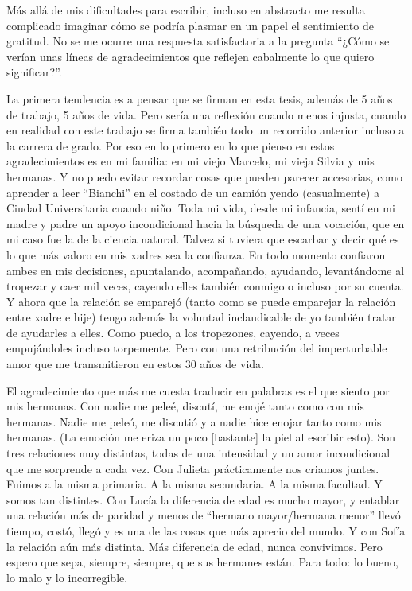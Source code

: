 Más allá de mis dificultades para escribir, incluso en abstracto me resulta complicado imaginar cómo se podría plasmar en un papel el sentimiento de gratitud.
No se me ocurre una respuesta satisfactoria a la pregunta ``¿Cómo se verían unas líneas de agradecimientos que reflejen cabalmente lo que quiero significar?''.

La primera tendencia es a pensar que se firman en esta tesis, además de 5 años de trabajo, 5 años de vida.
Pero sería una reflexión cuando menos injusta, cuando en realidad con este trabajo se firma también todo un recorrido anterior incluso a la carrera de grado.
Por eso en lo primero en lo que pienso en estos agradecimientos es en mi familia: en mi viejo Marcelo, mi vieja Silvia y mis hermanas.
Y no puedo evitar recordar cosas que pueden parecer accesorias, como aprender a leer ``Bianchi'' en el costado de un camión yendo (casualmente) a Ciudad Universitaria cuando niño.
Toda mi vida, desde mi infancia, sentí en mi madre y padre un apoyo incondicional hacia la búsqueda de una vocación, que en mi caso fue la de la ciencia natural.
Talvez si tuviera que escarbar y decir qué es lo que más valoro en mis xadres sea la confianza.
En todo momento confiaron ambes en mis decisiones, apuntalando, acompañando, ayudando, levantándome al tropezar y caer mil veces, cayendo elles también conmigo o incluso por su cuenta.
Y ahora que la relación se emparejó (tanto como se puede emparejar la relación entre xadre e hije) tengo además la voluntad inclaudicable de yo también tratar de ayudarles a elles.
Como puedo, a los tropezones, cayendo, a veces empujándoles incluso torpemente.
Pero con una retribución del imperturbable amor que me transmitieron en estos 30 años de vida.

El agradecimiento que más me cuesta traducir en palabras es el que siento por mis hermanas.
Con nadie me peleé, discutí, me enojé tanto como con mis hermanas.
Nadie me peleó, me discutió y a nadie hice enojar tanto como mis hermanas.
(La emoción me eriza un poco [bastante] la piel al escribir esto).
Son tres relaciones muy distintas, todas de una intensidad y un amor incondicional que me sorprende a cada vez.
Con Julieta prácticamente nos criamos juntes.
Fuimos a la misma primaria.
A la misma secundaria.
A la misma facultad.
Y somos tan distintes.
Con Lucía la diferencia de edad es mucho mayor, y entablar una relación más de paridad y menos de ``hermano mayor/hermana menor'' llevó tiempo, costó, llegó y es una de las cosas que más aprecio del mundo.
Y con Sofía la relación aún más distinta.
Más diferencia de edad, nunca convivimos.
Pero espero que sepa, siempre, siempre, que sus hermanes están.
Para todo: lo bueno, lo malo y lo incorregible.

